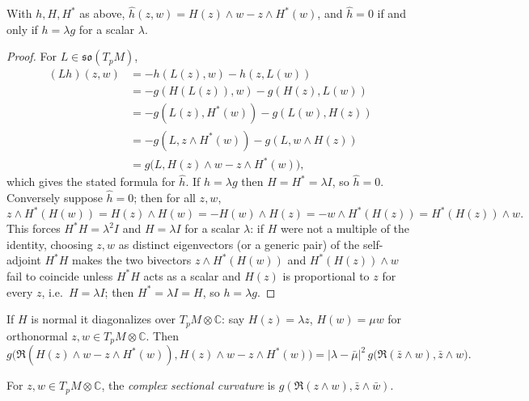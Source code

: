 \begin{proposition}[Proposition 9.4.11]
  \label{prop:pet-ch9-02tensor-hat-formula}
  With $h,H,H^*$ as above, $\hat h(z,w)=H(z)\wedge w-z\wedge H^*(w)$, and
  $\hat h=0$ if and only if $h=\lambda g$ for a scalar $\lambda$.
\end{proposition}
\begin{proof}
  For $L\in\mathfrak{so}(T_pM)$,
  \begin{align*}
    (Lh)(z,w)&=-h(L(z),w)-h(z,L(w))\\
    &=-g(H(L(z)),w)-g(H(z),L(w))\\
    &=-g(L(z),H^*(w))-g(L(w),H(z))\\
    &=-g(L,z\wedge H^*(w))-g(L,w\wedge H(z))\\
    &=g\big(L,H(z)\wedge w-z\wedge H^*(w)\big),
  \end{align*}
  which gives the stated formula for $\hat h$. If $h=\lambda g$ then
  $H=H^*=\lambda I$, so $\hat h=0$. Conversely suppose $\hat h=0$; then for all
  $z,w$,
  \[
    z\wedge H^*(H(w))=H(z)\wedge H(w)=-H(w)\wedge H(z)=-w\wedge H^*(H(z))
    =H^*(H(z))\wedge w.
  \]
  This forces $H^*H=\lambda^2I$ and $H=\lambda I$ for a scalar $\lambda$: if
  $H$ were not a multiple of the identity, choosing $z,w$ as distinct
  eigenvectors (or a generic pair) of the self-adjoint $H^*H$ makes the two
  bivectors $z\wedge H^*(H(w))$ and $H^*(H(z))\wedge w$ fail to coincide unless
  $H^*H$ acts as a scalar and $H(z)$ is proportional to $z$ for every $z$,
  i.e.\ $H=\lambda I$; then $H^*=\lambda I=H$, so $h=\lambda g$.
\end{proof}

If $H$ is normal it diagonalizes over $T_pM\otimes\mathbb{C}$: say $H(z)=\lambda z$,
$H(w)=\mu w$ for orthonormal $z,w\in T_pM\otimes\mathbb{C}$. Then
\[
  g\big(\mathfrak{R}(H(z)\wedge w-z\wedge H^*(w)),H(z)\wedge w-z\wedge H^*(w)\big)
  =|\lambda-\bar\mu|^2\,g\big(\mathfrak{R}(\bar z\wedge w),\bar z\wedge w\big).
\]

\begin{definition}
  \label{def:pet-ch9-complex-sectional-curvature}
  For $z,w\in T_pM\otimes\mathbb{C}$, the \emph{complex sectional curvature} is
  $g(\mathfrak{R}(z\wedge w),\bar z\wedge\bar w)$.
\end{definition}

